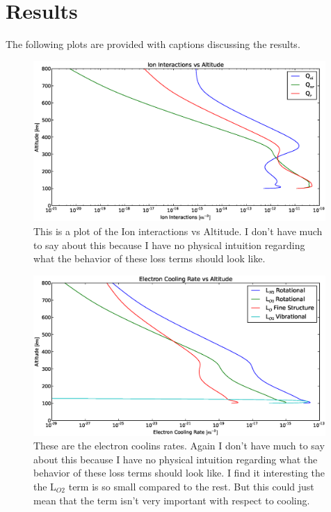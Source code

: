 \documentclass[10pt]{article}
\begin{document}
\section{Results}
The following plots are provided with captions discussing the results.
\begin{figure}[H]
	\centering
		\includegraphics[width=0.99\textwidth]{../Figures/B/Ion_Interactions_vs_Altitude.eps}
	\caption{This is a plot of the Ion interactions vs Altitude. I don't have much to say about this because I have no physical intuition regarding what the behavior of these loss terms should look like.}
	\label{fig:n1}
\end{figure}
\begin{figure}[H]
	\centering
		\includegraphics[width=0.99\textwidth]{../Figures/B/Electron_Cooling_Rates_vs_Altitude.eps}
	\caption{These are the electron coolins rates. Again I don't have much to say about this because I have no physical intuition regarding what the behavior of these loss terms should look like. I find it interesting the the L$_{O2}$ term is so small compared to the rest. But this could just mean that the term isn't very important with respect to cooling.}
	\label{fig:n2}
\end{figure}
\end{document}
